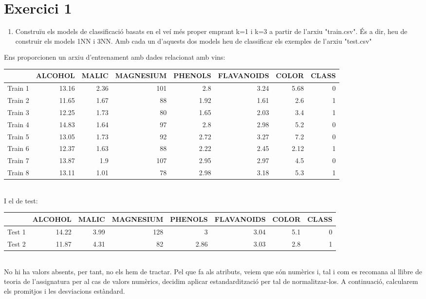 \documentclass{article} %
\begin{document}
\section{Exercici 1}
\begin{enumerate}[label=\alph*]
	\item Construïu els models de classificació basats en el veí més proper emprant k=1 i k=3 a partir de l'arxiu "train.csv". És a dir, heu de construir els models 1NN i 3NN. Amb cada un d'aquests dos models heu de classificar els exemples de l'arxiu "test.csv"
\end{enumerate}
{\color{blue}
	Ens proporcionen un arxiu d'entrenament amb dades relacionat amb vins:\\

	{\selectfont\small
	\begin{tabular}{l | r r r r r r r}
	 	& ALCOHOL & MALIC & MAGNESIUM & PHENOLS & FLAVANOIDS & COLOR & CLASS \\ \hline
		Train 1 & 13.16 & 2.36 & 101 & 2.8 & 3.24 & 5.68 & 0 \\
		Train 2 & 11.65 & 1.67 & 88 & 1.92 & 1.61 & 2.6 & 1 \\
		Train 3 & 12.25 & 1.73 & 80 & 1.65 & 2.03 & 3.4 & 1 \\
		Train 4 & 14.83 & 1.64 & 97 & 2.8 & 2.98 & 5.2 & 0 \\
		Train 5 & 13.05 & 1.73 & 92 & 2.72 & 3.27 & 7.2 & 0 \\
		Train 6 & 12.37 & 1.63 & 88 & 2.22 & 2.45 & 2.12 & 1 \\
		Train 7 & 13.87 & 1.9 & 107 & 2.95 & 2.97 & 4.5 & 0 \\
		Train 8 & 13.11 & 1.01 & 78 & 2.98 & 3.18 & 5.3 & 1 \\
	\end{tabular}
	} \\

	I el de test: \\

	{\selectfont\small
	\begin{tabular}{l | r r r r r r r}
	 	& ALCOHOL & MALIC & MAGNESIUM & PHENOLS & FLAVANOIDS & COLOR & CLASS \\ \hline
		Test 1 & 14.22 & 3.99 & 128 & 3 & 3.04 & 5.1 & 0 \\
		Test 2 & 11.87 & 4.31 & 82 & 2.86 & 3.03 & 2.8 & 1 \\
	\end{tabular}
	} \\

	No hi ha valors absents, per tant, no els hem de tractar. Pel que fa als atributs, veiem que són numèrics i, tal i com es recomana al llibre de teoria de l'assignatura per al cas de valors numèrics, decidim aplicar estandardització per tal de normalitzar-los. A continuació, calcularem els promitjos i les desviacions estàndard.\\

}
\end{document}
